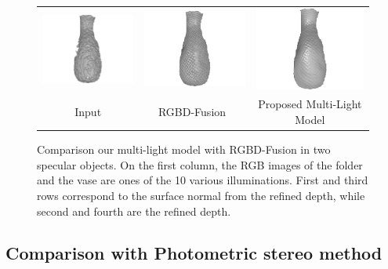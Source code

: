 \begin{figure}[!ht]
{\begin{tabular}{c|c c}
   \includegraphics[height = 0.24\linewidth]{figures/result/robust_vase_shape_init.pdf} 
   &
   \includegraphics[height = 0.24\linewidth]{figures/result/rgbd_vase_shape.pdf} &
   \includegraphics[height = 0.24\linewidth]{figures/result/robust_vase_shape.pdf}\\


   {Input} & {RGBD-Fusion~\cite{or2015rgbd}} & {Proposed Multi-Light Model}               
 \end{tabular}}
\caption{Comparison our multi-light model with RGBD-Fusion in two specular objects. On the first column, the RGB images of the folder and the vase are ones of  the 10 various illuminations. First and third rows correspond to the surface normal from the refined depth, while second and fourth are the refined depth.}
\label{fig:comp_specular}
\end{figure}

\subsection{Comparison with Photometric stereo method}





